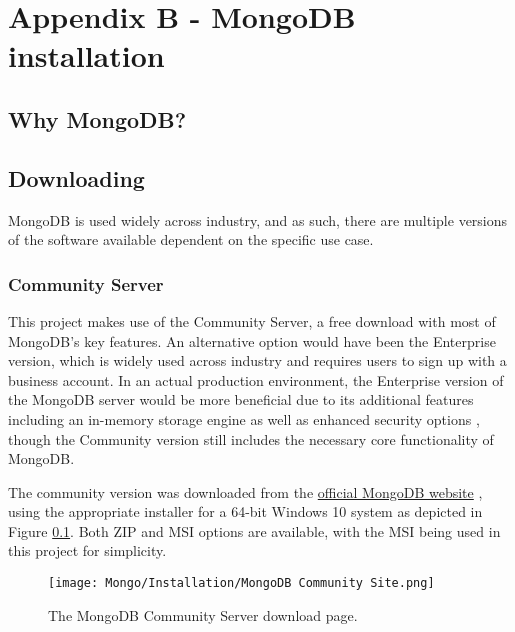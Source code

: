 \begingroup
\renewcommand\thechapter{B}
\titleformat{\chapter}[display]
{\normalfont\huge\bfseries}{}{20pt}{\Huge}
\setcounter{section}{0}
\setcounter{figure}{0} 

\chapter*{Appendix B - MongoDB installation}

\section{Why MongoDB?}


\section{Downloading}
MongoDB is used widely across industry, and as such, there are multiple versions of the software available dependent
on the specific use case.

\subsection{Community Server}

This project makes use of the Community Server, a free download with most of MongoDB's key features. An alternative 
option would have been the Enterprise version, which is widely used across industry and requires users to sign 
up with a business account. In an actual production environment, the Enterprise version of the MongoDB server 
would be more beneficial due to its additional features including an in-memory storage engine as well as enhanced 
security options \autocite{mongodbMongoDBEnterpriseServer}, though the Community version still includes the necessary 
core functionality of MongoDB.

\para The community version was downloaded from the \href{https://www.mongodb.com/try/download/community}{official MongoDB website} \autocite{mongodbTryMongoDBCommunity},
using the appropriate installer for a 64-bit Windows 10 system as depicted in Figure \ref{fig:MongoDownload}. Both ZIP and MSI options
are available, with the MSI being used in this project for simplicity.

\begin{figure}[H]
    \centering
    \texttt{[image: Mongo/Installation/MongoDB Community Site.png]}
    \caption{The MongoDB Community Server download page.\label{fig:MongoDownload}}
\end{figure}

